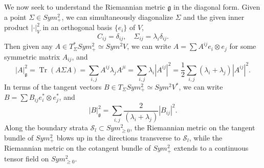 \documentclass[a4paper]{article}
\theoremstyle{definition}
\newcommand{\1}{\mathbbm{1}}
\DeclareMathOperator{\Tr}{Tr}
\begin{document}
	
	We now seek to understand the Riemannian metric $\mathfrak{g}$ in the diagonal form. Given a point $\Sigma\in Sym^2_+$, we can simultaneously diagonalize $\Sigma$ and the given inner product $|\cdot|_V^2$ in an orthogonal basis $\{ e_i\}$ of $V$,
	\[
	C_{ij}= \delta_{ij}, \quad \Sigma_{ij}=\lambda_i \delta_{ij}. 
	\]
	Then given any $A\in T_\Sigma^* Sym^2_+\simeq Sym^2 V$, we can write $A= \sum A^{ij} e_i\otimes e_j$ for some symmetric matrix $A_{ij}$, and
	\[
	|A|_{\mathfrak{g}}^2= \Tr (A\Sigma A) =\sum_{i,j}  A^{ij} \lambda_jA^{ji} =\sum_{i,j} \lambda_i |A^{ij}|^2= \frac{1}{2} \sum_{i,j} (\lambda_i+\lambda_j) |A^{ij}|^2. 
	\]
	In terms of the tangent vectors $B\in T_\Sigma Sym^2_+\simeq Sym^2 V^*$, we can write $B=\sum B_{ij}e_i^*\otimes e_j^* $, and 
	\begin{equation}\label{eqn:Riemannianmetrictangentspace}
		|B|_{\mathfrak{g}}^2=  \sum_{i,j} \frac{2}{(\lambda_i+\lambda_j)} |B_{ij}|^2.
	\end{equation}
	Along the boundary strata $\mathcal{S}_l\subset Sym^2_{\geq 0}$, the Riemannian metric on the tangent bundle of $Sym^2_+$ blows up in the directions transverse to $\mathcal{S}_l$, while the Riemannian metric on the cotangent bundle of $Sym^2_+$ extends to a continuous tensor field on $Sym^2_{\geq 0}$. 
	
	
	
	
	
	
	
	
	
	
	
	
	
	
	
	
\end{document}

